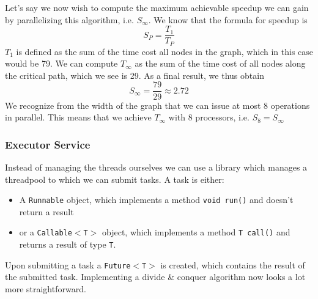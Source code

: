 \documentclass[main.tex]{subfiles}
\begin{document}
\begin{example}
\begin{center}
    \end{center}
    Let's say we now wish to compute the maximum achievable speedup we can gain by parallelizing this algorithm, i.e. $S_\infty$. We know that the formula for speedup is
    \begin{equation*}
        S_P = \frac{T_1}{T_P}
    \end{equation*}
    $T_1$ is defined as the sum of the time cost all nodes in the graph, which in this case would be 79.  We can compute $T_\infty$ as the sum of the time cost of all nodes along the critical path, which we see is 29. As a final result, we thus obtain
    \begin{equation*}
        S_\infty = \frac{79}{29} \approx 2.72
    \end{equation*}
    We recognize from the width of the graph that we can issue at most 8 operations in parallel. This means that we achieve $T_\infty$ with 8 processors, i.e. $S_8 = S_\infty$
\end{example}


\subsubsection{Executor Service}
Instead of managing the threads ourselves we can use a library which manages a threadpool to which we can submit tasks. A task is either:
\begin{itemize}
    \item A \texttt{Runnable} object, which implements a method \texttt{void run()} and doesn't return a result
    \item or a \texttt{Callable$<$T$>$} object, which implements a method \texttt{T call()} and returns a result of type \texttt{T}.
\end{itemize}
Upon submitting a task a \texttt{Future$<$T$>$} is created, which contains the result of the submitted task. Implementing a divide \& conquer algorithm now looks a lot more straightforward.

\newpage
\end{document}
